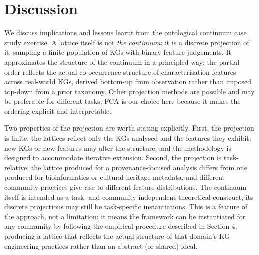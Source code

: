 \documentclass[runningheads]{llncs}
\newenvironment{onlyextended}{\ignorespaces}{\ignorespacesafterend}
\begin{document}
\begin{onlyextended}
\section{Discussion}\label{sec:discussion}
We discuss implications and lessons learnt from the ontological continuum case study exercise.
A lattice itself is not \textit{the continuum}: it is a discrete projection of it, sampling a finite population of KGs with binary feature judgements. 
It approximates the structure of the continuum in a principled way: the partial order reflects the actual co-occurrence structure of characterisation features across real-world KGs, derived bottom-up from observation rather than imposed top-down from a prior taxonomy. 
Other projection methods are possible and may be preferable for different tasks; FCA is our choice here because it makes the ordering explicit and interpretable.

Two properties of the projection are worth stating explicitly. 
First, the projection is finite: the lattices reflect only the KGs analysed and the features they exhibit; new KGs or new features may alter the structure, and the methodology is designed to accommodate iterative extension. 
Second, the projection is task-relative: the lattice produced for a provenance-focused analysis differs from one produced for bioinformatics or cultural heritage metadata, and different community practices give rise to different feature distributions. 
The continuum itself is intended as a task- and community-independent theoretical construct; its discrete projections may still be task-specific instantiations. 
This is a feature of the approach, not a limitation: it means the framework can be instantiated for any community by following the empirical procedure described in Section 4, producing a lattice that reflects the actual structure of that domain's KG engineering practices rather than an abstract (or shared) ideal.


\end{onlyextended}
\end{document}
